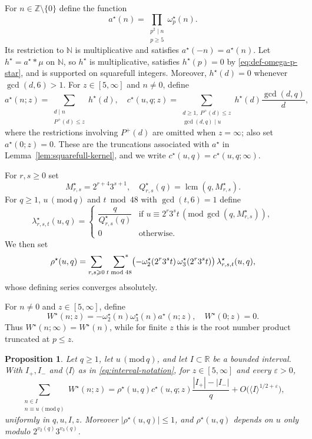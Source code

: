 \documentclass[12pt,reqno]{amsart}
\numberwithin{equation}{section}
\newtheorem{proposition}[theorem]{Proposition}
\theoremstyle{definition}
\renewcommand{\le}{\leqslant}
\renewcommand{\ge}{\geqslant}
\newcommand{\sumstar}{\sideset{}{^*}\sum}
\newcommand{\ZZ}{\mathbb{Z}}
\newcommand{\NN}{\mathbb{N}}
\newcommand{\RR}{\mathbb{R}}
\newcommand{\rw}{W}
\renewcommand{\pmod}[1]{\,(\mathrm{mod}\,#1)}
\begin{document}
For $n\in\ZZ\setminus\{0\}$ define the function
\begin{equation}\label{eq:def-a-star}
a^\star(n)=\prod_{\substack{p^2\mid n\\ p\ge 5}}\omega_p^\star(n).
\end{equation}
Its restriction to $\NN$ is multiplicative and satisfies $a^\star(-n)=a^\star(n)$.
Let $h^\star=a^\star*\mu$ on $\NN$, so $h^\star$ is multiplicative, satisfies $h^\star(p)=0$ by \eqref{eq:def-omega-p-star}, and is supported on squarefull integers.
Moreover, $h^\star(d)=0$ whenever $\gcd(d,6)>1$.
For $z\in[5,\infty]$ and $n\ne0$, define
\[
a^\star(n;z)=\sum_{\substack{d\mid n\\P^+(d)\le z}}h^\star(d),\quad
c^\star(u,q;z)=\sum_{\substack{d\ge1,\ P^+(d)\le z\\\gcd(d,q)\mid u}}
h^\star(d)\frac{\gcd(d,q)}d,
\]
where the restrictions involving $P^+(d)$ are omitted when $z=\infty$; also set $a^\star(0;z)=0$.
These are the truncations associated with $a^\star$ in Lemma~\ref{lem:squarefull-kernel}, and we write $c^\star(u,q)=c^\star(u,q;\infty)$.

For $r,s\ge 0$ set
\[
M^\star_{r,s}=2^{r+4}3^{s+1},
\quad
Q^\star_{r,s}(q)=\operatorname{lcm}(q,M^\star_{r,s}).
\]
For $q\ge 1$, $u\pmod q$ and $t\bmod48$ with $\gcd(t,6)=1$ define
\[
\lambda^\star_{r,s,t}(u,q)=
\begin{cases}
\dfrac{q}{Q^\star_{r,s}(q)} & \text{if } u\equiv 2^{r}3^{s}t
\pmod{\gcd(q,M^\star_{r,s})},\\
0 & \text{otherwise}.
\end{cases}
\]
We then set
\begin{equation}\label{eq:def-rho-star}
\rho^\star(u,q)=\sum_{r,s\ge 0}\ \sumstar_{t\bmod48}
\bigl(-\omega_2^\star(2^{r}3^{s}t)\,\omega_3^\star(2^{r}3^{s}t)\bigr)\,
\lambda^\star_{r,s,t}(u,q),
\end{equation}
whose defining series converges absolutely.

For $n\ne0$ and $z\in[5,\infty]$, define
\begin{equation}\label{eq:rw-star-z}
\rw^\star(n;z)
=-\omega_2^\star(n)\omega_3^\star(n)a^\star(n;z),
\quad \rw^\star(0;z)=0.
\end{equation}
Thus $\rw^\star(n;\infty)=\rw^\star(n)$, while for finite $z$ this is the root number product truncated at $p\le z$.

\begin{proposition}\label{prop:rw-interval-star}
Let $q\ge1$, let $u\pmod q$, and let $I\subset\RR$ be a bounded interval.
With $I_+,I_-$ and $\langle I\rangle$ as in \eqref{eq:interval-notation}, for $z\in[5,\infty]$ and every $\varepsilon>0$,
\[
\sum_{\substack{n\in I\\ n\equiv u\pmod q}}\rw^\star(n;z)
=\rho^\star(u,q)c^\star(u,q;z)
\frac{|I_+|-|I_-|}{q}
+O\bigl(\langle I\rangle^{1/2+\varepsilon}\bigr),
\]
uniformly in $q,u,I,z$.
Moreover $|\rho^\star(u,q)|\le1$, and $\rho^\star(u,q)$ depends on $u$ only modulo $2^{v_2(q)}3^{v_3(q)}$.
\end{proposition}
\end{document}
